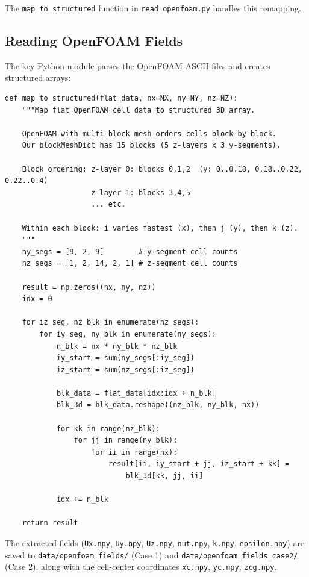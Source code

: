 \documentclass[12pt]{article}
\begin{document}
The \texttt{map\_to\_structured} function in \texttt{read\_openfoam.py} handles this remapping.

\subsection{Reading OpenFOAM Fields}

The key Python module parses the OpenFOAM ASCII files and creates structured arrays:

\begin{lstlisting}[style=python, caption={Key snippet from \texttt{read\_openfoam.py}: mapping block-ordered data to structured grid}]
def map_to_structured(flat_data, nx=NX, ny=NY, nz=NZ):
    """Map flat OpenFOAM cell data to structured 3D array.

    OpenFOAM with multi-block mesh orders cells block-by-block.
    Our blockMeshDict has 15 blocks (5 z-layers x 3 y-segments).

    Block ordering: z-layer 0: blocks 0,1,2  (y: 0..0.18, 0.18..0.22, 0.22..0.4)
                    z-layer 1: blocks 3,4,5
                    ... etc.

    Within each block: i varies fastest (x), then j (y), then k (z).
    """
    ny_segs = [9, 2, 9]        # y-segment cell counts
    nz_segs = [1, 2, 14, 2, 1] # z-segment cell counts

    result = np.zeros((nx, ny, nz))
    idx = 0

    for iz_seg, nz_blk in enumerate(nz_segs):
        for iy_seg, ny_blk in enumerate(ny_segs):
            n_blk = nx * ny_blk * nz_blk
            iy_start = sum(ny_segs[:iy_seg])
            iz_start = sum(nz_segs[:iz_seg])

            blk_data = flat_data[idx:idx + n_blk]
            blk_3d = blk_data.reshape((nz_blk, ny_blk, nx))

            for kk in range(nz_blk):
                for jj in range(ny_blk):
                    for ii in range(nx):
                        result[ii, iy_start + jj, iz_start + kk] =
                            blk_3d[kk, jj, ii]

            idx += n_blk

    return result
\end{lstlisting}

The extracted fields (\texttt{Ux.npy}, \texttt{Uy.npy}, \texttt{Uz.npy}, \texttt{nut.npy}, \texttt{k.npy}, \texttt{epsilon.npy}) are saved to \texttt{data/openfoam\_fields/} (Case 1) and \texttt{data/openfoam\_fields\_case2/} (Case 2), along with the cell-center coordinates \texttt{xc.npy}, \texttt{yc.npy}, \texttt{zcg.npy}.
\end{document}

